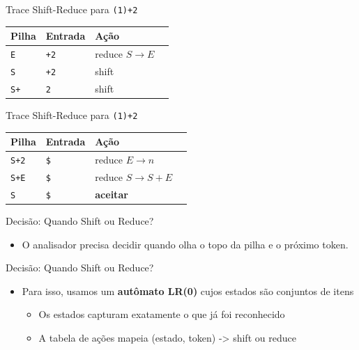 \begin{frame}[fragile]{Trace Shift-Reduce para
    \texttt{(1)+2}}

    \begin{table}
        \begin{tabular}{l l l l}
            \hline
            Pilha & Entrada & Ação \\
            \hline
            \texttt{E} & \texttt{+2} & reduce
            \(S \to E\) \\
            \texttt{S} & \texttt{+2} & shift \\
            \texttt{S+} & \texttt{2} & shift \\
            \hline
        \end{tabular}
    \end{table}
\end{frame}

\begin{frame}[fragile]{Trace Shift-Reduce para
    \texttt{(1)+2}}

    \begin{table}
        \begin{tabular}{l l l l}
            \hline
            Pilha & Entrada & Ação \\
            \hline
            \texttt{S+2} & \verb|$| & reduce
            \(E \to n\) \\
            \texttt{S+E} & \verb|$| & reduce
            \(S \to S+E\) \\
            \texttt{S} & \verb|$| &
            \textbf{aceitar} \\
            \hline
        \end{tabular}
    \end{table}
\end{frame}

\begin{frame}{Decisão: Quando Shift ou Reduce?}

    \begin{itemize}

        \item
        O analisador precisa decidir quando olha o topo da pilha e o próximo
        token.
    \end{itemize}
\end{frame}

\begin{frame}{Decisão: Quando Shift ou Reduce?}

    \begin{itemize}

        \item
        Para isso, usamos um \textbf{autômato LR(0)} cujos estados são
        conjuntos de itens

        \begin{itemize}

            \item
            Os estados capturam exatamente o que já foi reconhecido
            \item
            A tabela de ações mapeia (estado, token) -> shift ou reduce
        \end{itemize}
    \end{itemize}
\end{frame}


